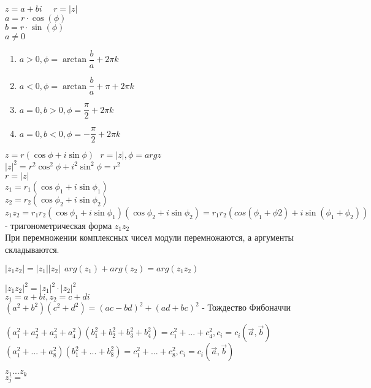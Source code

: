 $ z = a + bi \ \ \ \ \ \ r = |z| $\\
$ a = r \cdot \cos(\phi) $ \\
$ b = r \cdot \sin(\phi) $ \\
$ a \neq 0 $ \\
\begin{enumerate}
	\item $ a > 0, \phi = \arctan \dfrac{b}{a} + 2\pi k$
	\item $ a < 0, \phi = \arctan \dfrac{b}{a} + \pi + 2\pi k $ 
	\item $ a = 0, b > 0, \phi = \dfrac{\pi}{2} + 2 \pi k $ 
	\item $ a =0, b < 0, \phi = -\dfrac{\pi}{2} + 2 \pi k $
\end{enumerate}
$ z = r(\cos \phi + i \sin \phi)  \ \ \ r = |z|, \phi = arg z $ \\
$ |z|^2 = r^2\cos^2\phi + i^2 \sin^2\phi=r^2 $\\
$ r = |z| $ \\
$ z_1 = r_1(\cos \phi_1 + i \sin\phi_1) $ \\
$ z_2 = r_2(\cos \phi_2 + i \sin\phi_2) $ \\
$ z_1z_2 = r_1r_2(\cos\phi_1 + i \sin\phi_1) (\cos\phi_2 + i \sin\phi_2) =
r_1r_2 (cos(\phi_1 + \phi2) + i \sin(\phi_1 + \phi_2)) $ - тригонометрическая форма $ z_1z_2 $ \\
При перемножении комплексных чисел модули перемножаются, а аргументы складываются.
\begin{consequence}
	$ |z_1z_2| = |z_1||z_2| \ \ arg(z_1) + arg(z_2) = arg(z_1z_2)$
\end{consequence} 
\begin{consequence}
	$ |z_1z_2|^2 = |z_1|^2 \cdot|z_2|^2 $\\
	$ z_1 = a + bi, z_2 = c + di $ \\
	$ (a^2+b^2)(c^2 + d^2) = (ac-bd)^2 + (ad + bc)^2 $ - Тождество Фибоначчи \\
	\begin{remark}
		$ (a_1^2 + a_2^2 + a_3^2 + a_4^2)(b_1^2 + b_2^2 + b_3^2 + b_4^2) = c_1^2+ ... + c_4^2, c_i = c_i(\vec{a}, \vec{b})$ \\
		$ (a_1^2 + ... + a_8^2)(b_1^2 + ... + b_8^2) = c_1^2+ ... + c_8^2, c_i = c_i(\vec{a}, \vec{b}) $
	\end{remark}
\end{consequence} 
\begin{consequence}
	$ z_1 ... z_k $ \\
	$ z_j =  $ %
\end{consequence}
